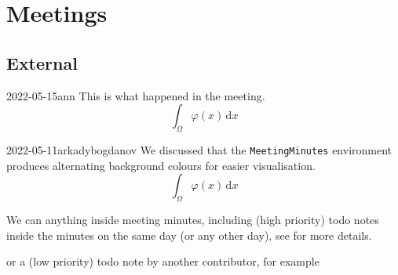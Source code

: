 \documentclass{project-logbook}
\begin{document}
\section{Meetings}
	\subsection{External}
		\begin{MeetingMinutes}{2022-05-15}{ann}
			This is what happened in the meeting.
			\begin{equation}
				\int_{\Omega}{\varphi(x)}\,\mathrm{d}x
			\end{equation}
			\lipsum[4]
		\end{MeetingMinutes}

		\begin{MeetingMinutes}{2022-05-11}{arkadybogdanov}
			We discussed that the \texttt{MeetingMinutes} environment produces alternating background colours for easier visualisation.
			\begin{equation}
				\int_{\Omega}{\varphi(x)}\,\mathrm{d}x
			\end{equation}

			\lipsum[3]

			We can anything inside meeting minutes, including (high priority) todo notes inside the minutes on the same day (or any other day), see  for more details.


			or a (low priority) todo note by another contributor, for example

		\end{MeetingMinutes}
\end{document}
